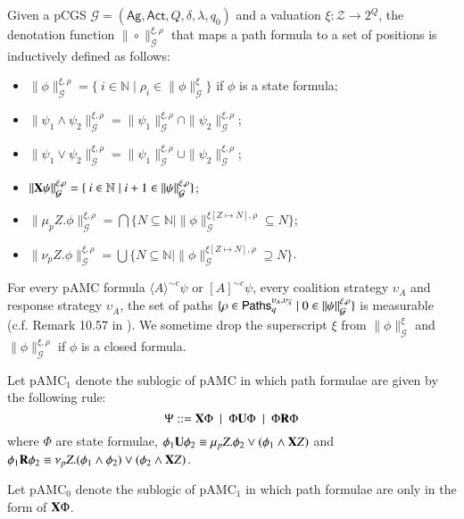 \documentclass[letterpaper]{article}
\newcommand{\calZ}{\mathcal{Z}}
\newcommand{\calM}{\mathcal{G}}
\newcommand{\calP}{{\sf Paths}}
\newcommand{\Ag}{\textsf{Ag}}
\newcommand{\Act}{\textsf{Act}}
\newcommand{\Cycl}{\textsf{Cycl}}
\newcommand{\nA}{\overline{A}}
\newcommand{\pamc}{{pAMC}\xspace}
\newcommand{\pamcs}{{pAMC$_0$}\xspace}
\newcommand{\pamcc}{{pAMC$_1$}\xspace}
\newcommand{\Nn}{\mathbb{N}}
\newcommand{\opX}{{\bf X}}
\newcommand{\opU}{{\bf U}}
\newcommand{\opR}{{\bf R}}
\newcommand{\opA}[1]{\langle{#1}\rangle}
\newcommand{\opUA}[1]{[{#1}]}
\newcommand {\semantics}[1]{\|{#1}\|}  %
\begin{document}
Given a pCGS $\calM=(\Ag,\Act, Q, \delta,\lambda,q_0)$ and a valuation $\xi:\calZ\rightarrow 2^Q$,
the denotation function $\semantics{\circ}_\calM^{\xi,\rho}$ that maps a path formula to a set of positions is inductively defined as follows:
\begin{itemize}
  \item $\semantics{\phi}_\calM^{\xi,\rho}=\{ \ i\in \Nn\mid \rho_i\in \semantics{\phi}_\calM^\xi\}$ if $\phi$ is a state formula;
  \item $\semantics{\psi_1\wedge \psi_2}_\calM^{\xi,\rho}=\semantics{\psi_1}_\calM^{\xi,\rho}\cap\semantics{\psi_2}_\calM^{\xi,\rho}$;
  \item $\semantics{\psi_1\vee \psi_2}_\calM^{\xi,\rho}=\semantics{\psi_1}_\calM^{\xi,\rho}\cup\semantics{\psi_2}_\calM^{\xi,\rho}$;
  \item $\semantics{\opX \psi}_\calM^{\xi,\rho}=\{ \ i\in \Nn\mid i+1\in \semantics{\psi}_\calM^{\xi,\rho}\}$;
  \item $\semantics{\mu_p Z. \phi}_\calM^{\xi,\rho}=\bigcap\{N\subseteq \Nn\mid \semantics{\phi}_\calM^{\xi[Z\mapsto N],\rho}\subseteq N\}$;
  \item	$\semantics{\nu_p Z. \phi}_\calM^{\xi,\rho}=\bigcup\{N\subseteq \Nn\mid \semantics{\phi}_\calM^{\xi[Z\mapsto N],\rho}\supseteq N\}$.
 \end{itemize}

For every \pamc formula $\opA{A}^{\sim c}\psi$ or $\opUA{A}^{\sim c}\psi$, every coalition strategy $\upsilon_A$ and response strategy $\upsilon_{\nA}$, the set of paths $\{\rho\in \calP_q^{\upsilon_A,\upsilon_{\nA}}\mid 0\in\semantics{\psi}_\calM^{\xi,\rho}\}$ is measurable (c.f. Remark 10.57 in \cite{BK08}).
We sometime drop the superscript $\xi$ from $\semantics{\phi}_\calM^\xi$ and $\semantics{\phi}_\calM^{\xi,\rho}$ if $\phi$ is a closed formula.

Let \pamcc denote the sublogic of \pamc in which path formulae are given by the following rule:
\[\Psi::=\opX \Phi \ \mid  \ \Phi\opU\Phi \ \mid  \ \Phi\opR\Phi\]
where $\Phi$ are state formulae, $\phi_1\opU\phi_2\equiv \mu_p Z. \phi_2 \vee (\phi_1\wedge \opX Z)$ and
$\phi_1\opR\phi_2\equiv \nu_p Z. (\phi_1\wedge\phi_2) \vee (\phi_2\wedge \opX Z)$.


Let \pamcs denote the sublogic of \pamcc in which path formulae are only in the form of $\opX \Phi$.
\end{document}
